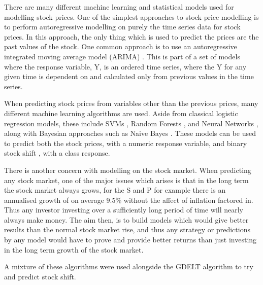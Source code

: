 There are many different machine learning and statistical models used for modelling stock prices. One of the simplest approaches to stock price modelling is to perform autoregressive modelling on purely the time series data for stock prices. In this approach, the only thing which is used to predict the prices are the past values of the stock. One common approach is to use an autoregressive integrated moving average model (ARIMA) \cite{ariyo2014stock}. This is part of a set of models where the response variable, Y, is an ordered time series, where the Y for any given time is dependent on and calculated only from previous values in the time series. 

When predicting stock prices from variables other than the previous prices, many different machine learning algorithms are used. Aside from classical logistic regression models, these include SVMs \cite{cao2003support}, Random Forests \cite{khaidem2016predicting}, and Neural Networks \cite{egeli2003stock}, along with Bayesian approaches such as Naive Bayes \cite{khedr2017predicting}. These models can be used to predict both the stock prices, with a numeric response variable, and binary stock shift \cite{nguyen2015sentiment}, with a class response.  

There is another concern with modelling on the stock market. When predicting any stock market, one of the major issues which arises is that in the long term the stock market always grows, for the S and P for example there is an annualised growth of on average 9.5\% \cite{sp} without the affect of inflation factored in. Thus any investor investing over a sufficiently long period of time will nearly always make money. The aim then, is to build models which would give better results than the normal stock market rise, and thus any strategy or predictions by any model would have to prove and provide better returns than just investing in the long term growth of the stock market.

A mixture of these algorithms were used alongside the GDELT algorithm to try and predict stock shift. 

